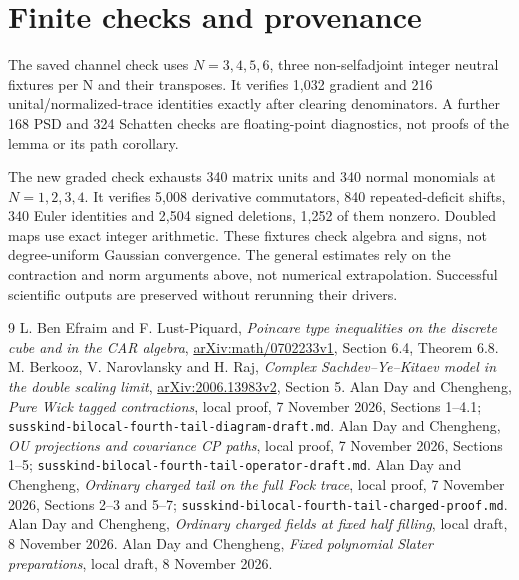\documentclass[11pt]{article}
\begin{document}
\section{Finite checks and provenance}
The saved channel check uses $N=3,4,5,6$, three non-selfadjoint
integer neutral fixtures per N and their transposes. It verifies
1,032 gradient and 216 unital/normalized-trace identities exactly
after clearing denominators. A further 168 PSD and 324 Schatten
checks are floating-point diagnostics, not proofs of the lemma
or its path corollary.

The new graded check exhausts 340 matrix units and 340 normal
monomials at $N=1,2,3,4$. It verifies 5,008 derivative
commutators, 840 repeated-deficit shifts, 340 Euler identities
and 2,504 signed deletions, 1,252 of them nonzero. Doubled maps
use exact integer arithmetic. These fixtures check algebra and
signs, not degree-uniform Gaussian convergence. The general
estimates rely on the contraction and norm arguments above,
not numerical extrapolation. Successful scientific outputs
are preserved without rerunning their drivers.

\begin{thebibliography}{9}
 L. Ben Efraim and F. Lust-Piquard,
\emph{Poincare type inequalities on the discrete cube and in the CAR algebra},
\href{https://arxiv.org/abs/math/0702233}{arXiv:math/0702233v1},
Section 6.4, Theorem 6.8.
 M. Berkooz, V. Narovlansky and H. Raj,
\emph{Complex Sachdev--Ye--Kitaev model in the double scaling limit},
\href{https://arxiv.org/abs/2006.13983}{arXiv:2006.13983v2}, Section 5.
 Alan Day and Chengheng, \emph{Pure Wick tagged
contractions}, local proof, 7 November 2026, Sections 1--4.1;
\texttt{susskind-bilocal-fourth-tail-diagram-draft.md}.
 Alan Day and Chengheng, \emph{OU projections
and covariance CP paths}, local proof, 7 November 2026, Sections 1--5;
\texttt{susskind-bilocal-fourth-tail-operator-draft.md}.
 Alan Day and Chengheng, \emph{Ordinary charged
tail on the full Fock trace}, local proof, 7 November 2026,
Sections 2--3 and 5--7;
\texttt{susskind-bilocal-fourth-tail-charged-proof.md}.
 Alan Day and Chengheng, \emph{Ordinary charged
fields at fixed half filling}, local draft, 8 November 2026.
 Alan Day and Chengheng, \emph{Fixed polynomial
Slater preparations}, local draft, 8 November 2026.
\end{thebibliography}
\end{document}
